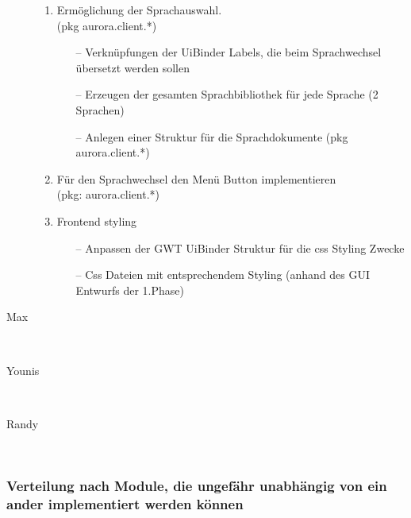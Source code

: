 \documentclass[parskip=full,11pt,twoside]{scrartcl}
\begin{document}
\begin{description}
   
    \begin{enumerate}
    
    
    \item Ermöglichung der Sprachauswahl.  \\(pkg aurora.client.*)
    
    \begin{itemize}
    
	\item[--] Verknüpfungen der UiBinder Labels, die beim Sprachwechsel übersetzt werden sollen
	
	\item[--] Erzeugen der gesamten Sprachbibliothek für jede Sprache (2 Sprachen)
	
	\item[--] Anlegen einer Struktur für die Sprachdokumente (pkg aurora.client.*)
	
    \end{itemize}
    
    \item Für den Sprachwechsel den Menü Button implementieren \\(pkg: aurora.client.*)
    
    \item Frontend styling
    
    \begin{itemize}
    
	\item[--] Anpassen der GWT UiBinder Struktur für die css Styling Zwecke
	
	\item[--] Css Dateien mit entsprechendem Styling (anhand des GUI Entwurfs der 1.Phase)

    \end{itemize}
    
    \end{enumerate}
    
    \item [Max]\hfill \\
    \item [Younis]\hfill \\
    \item [Randy]\hfill \\
\end{description}


\subsubsection{Verteilung nach Module, die ungefähr unabhängig von ein ander implementiert werden können}
\end{document}
